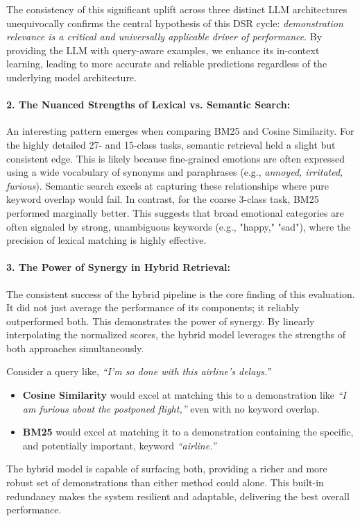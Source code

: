 The consistency of this significant uplift across three distinct LLM architectures unequivocally confirms the central hypothesis of this DSR cycle: \textit{demonstration relevance is a critical and universally applicable driver of performance}. By providing the LLM with query-aware examples, we enhance its in-context learning, leading to more accurate and reliable predictions regardless of the underlying model architecture.

\paragraph{2. The Nuanced Strengths of Lexical vs. Semantic Search:}
An interesting pattern emerges when comparing BM25 and Cosine Similarity. For the highly detailed 27- and 15-class tasks, semantic retrieval held a slight but consistent edge. This is likely because fine-grained emotions are often expressed using a wide vocabulary of synonyms and paraphrases (e.g., \textit{annoyed, irritated, furious}). Semantic search excels at capturing these relationships where pure keyword overlap would fail. In contrast, for the coarse 3-class task, BM25 performed marginally better. This suggests that broad emotional categories are often signaled by strong, unambiguous keywords (e.g., "happy," "sad"), where the precision of lexical matching is highly effective.

\paragraph{3. The Power of Synergy in Hybrid Retrieval:}
The consistent success of the hybrid pipeline is the core finding of this evaluation. It did not just average the performance of its components; it reliably outperformed both. This demonstrates the power of synergy. By linearly interpolating the normalized scores, the hybrid model leverages the strengths of both approaches simultaneously.

Consider a query like, \textit{“I'm so done with this airline's delays.”}
\begin{itemize}
    \item \textbf{Cosine Similarity} would excel at matching this to a demonstration like \textit{“I am furious about the postponed flight,”} even with no keyword overlap.
    \item \textbf{BM25} would excel at matching it to a demonstration containing the specific, and potentially important, keyword \textit{“airline.”}
\end{itemize}
The hybrid model is capable of surfacing both, providing a richer and more robust set of demonstrations than either method could alone. This built-in redundancy makes the system resilient and adaptable, delivering the best overall performance.

